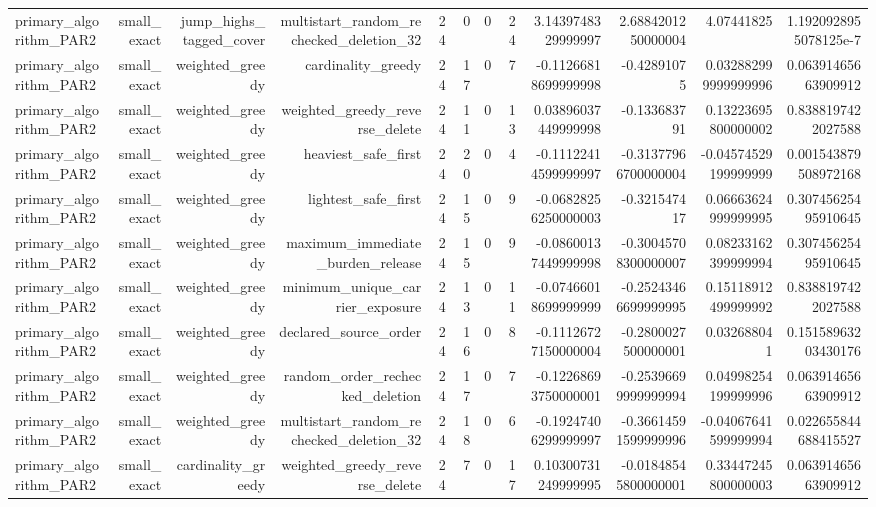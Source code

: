 {\begin{longtable}{lrrrrrrrrrrr}
primary\_algorithm\_PAR2 & small\_exact & jump\_highs\_tagged\_cover & multistart\_random\_rechecked\_deletion\_32 & 24 & 0 & 0 & 24 & 3.1439748329999997 & 2.6884201250000004 & 4.07441825 & 1.1920928955078125e-7 \\
primary\_algorithm\_PAR2 & small\_exact & weighted\_greedy & cardinality\_greedy & 24 & 17 & 0 & 7 & -0.11266818699999998 & -0.42891075 & 0.032882999999999996 & 0.06391465663909912 \\
primary\_algorithm\_PAR2 & small\_exact & weighted\_greedy & weighted\_greedy\_reverse\_delete & 24 & 11 & 0 & 13 & 0.03896037449999998 & -0.133683791 & 0.13223695800000002 & 0.8388197422027588 \\
primary\_algorithm\_PAR2 & small\_exact & weighted\_greedy & heaviest\_safe\_first & 24 & 20 & 0 & 4 & -0.11122414599999997 & -0.31377966700000004 & -0.04574529199999999 & 0.001543879508972168 \\
primary\_algorithm\_PAR2 & small\_exact & weighted\_greedy & lightest\_safe\_first & 24 & 15 & 0 & 9 & -0.06828256250000003 & -0.321547417 & 0.06663624999999995 & 0.30745625495910645 \\
primary\_algorithm\_PAR2 & small\_exact & weighted\_greedy & maximum\_immediate\_burden\_release & 24 & 15 & 0 & 9 & -0.08600137449999998 & -0.30045708300000007 & 0.08233162399999994 & 0.30745625495910645 \\
primary\_algorithm\_PAR2 & small\_exact & weighted\_greedy & minimum\_unique\_carrier\_exposure & 24 & 13 & 0 & 11 & -0.07466018699999999 & -0.25243466699999995 & 0.15118912499999992 & 0.8388197422027588 \\
primary\_algorithm\_PAR2 & small\_exact & weighted\_greedy & declared\_source\_order & 24 & 16 & 0 & 8 & -0.11126727150000004 & -0.2800027500000001 & 0.032688041 & 0.15158963203430176 \\
primary\_algorithm\_PAR2 & small\_exact & weighted\_greedy & random\_order\_rechecked\_deletion & 24 & 17 & 0 & 7 & -0.12268693750000001 & -0.25396699999999994 & 0.04998254199999996 & 0.06391465663909912 \\
primary\_algorithm\_PAR2 & small\_exact & weighted\_greedy & multistart\_random\_rechecked\_deletion\_32 & 24 & 18 & 0 & 6 & -0.19247406299999997 & -0.36614591599999996 & -0.04067641599999994 & 0.022655844688415527 \\
primary\_algorithm\_PAR2 & small\_exact & cardinality\_greedy & weighted\_greedy\_reverse\_delete & 24 & 7 & 0 & 17 & 0.10300731249999995 & -0.01848545800000001 & 0.33447245800000003 & 0.06391465663909912 \\

\end{longtable}}
